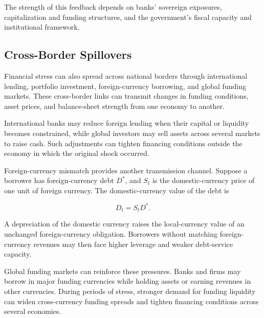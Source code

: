 The strength of this feedback depends on banks' sovereign exposures, capitalization and funding structures, and the government's fiscal capacity and institutional framework.

\subsection{Cross-Border Spillovers}

Financial stress can also spread across national borders through international lending, portfolio investment, foreign-currency borrowing, and global funding markets. These cross-border links can transmit changes in funding conditions, asset prices, and balance-sheet strength from one economy to another.

International banks may reduce foreign lending when their capital or liquidity becomes constrained, while global investors may sell assets across several markets to raise cash. Such adjustments can tighten financing conditions outside the economy in which the original shock occurred.

Foreign-currency mismatch provides another transmission channel. Suppose a borrower has foreign-currency debt \(D^{*}\), and \(S_t\) is the domestic-currency price of one unit of foreign currency. The domestic-currency value of the debt is

\begin{equation}
D_t=S_tD^{*}.
\label{eq:ch21-fx-debt}
\end{equation}

A depreciation of the domestic currency raises the local-currency value of an unchanged foreign-currency obligation. Borrowers without matching foreign-currency revenues may then face higher leverage and weaker debt-service capacity.

Global funding markets can reinforce these pressures. Banks and firms may borrow in major funding currencies while holding assets or earning revenues in other currencies. During periods of stress, stronger demand for funding liquidity can widen cross-currency funding spreads and tighten financing conditions across several economies.

